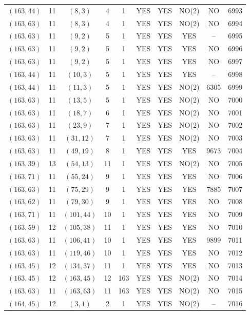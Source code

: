 \begin{longtable}{|c|c|c|c|c|c|c|c|c|c|}
$(163, 44)$ & 11 & $(8, 3)$ & 4 & 1 & YES & YES & NO(2) & NO & 6993\\
$(163, 63)$ & 11 & $(8, 3)$ & 4 & 1 & YES & YES & NO(2) & NO & 6994\\
$(163, 63)$ & 11 & $(9, 2)$ & 5 & 1 & YES & YES & YES & -- & 6995\\
$(163, 63)$ & 11 & $(9, 2)$ & 5 & 1 & YES & YES & YES & NO & 6996\\
$(163, 63)$ & 11 & $(9, 2)$ & 5 & 1 & YES & YES & YES & NO & 6997\\
$(163, 44)$ & 11 & $(10, 3)$ & 5 & 1 & YES & YES & YES & -- & 6998\\
$(163, 44)$ & 11 & $(11, 3)$ & 5 & 1 & YES & YES & NO(2) & 6305 & 6999\\
$(163, 63)$ & 11 & $(13, 5)$ & 5 & 1 & YES & YES & NO(2) & NO & 7000\\
$(163, 63)$ & 11 & $(18, 7)$ & 6 & 1 & YES & YES & NO(2) & NO & 7001\\
$(163, 63)$ & 11 & $(23, 9)$ & 7 & 1 & YES & YES & NO(2) & NO & 7002\\
$(163, 63)$ & 11 & $(31, 12)$ & 7 & 1 & YES & YES & NO(2) & NO & 7003\\
$(163, 63)$ & 11 & $(49, 19)$ & 8 & 1 & YES & YES & YES & 9673 & 7004\\
$(163, 39)$ & 13 & $(54, 13)$ & 11 & 1 & YES & YES & NO(2) & NO & 7005\\
$(163, 71)$ & 11 & $(55, 24)$ & 9 & 1 & YES & YES & YES & NO & 7006\\
$(163, 63)$ & 11 & $(75, 29)$ & 9 & 1 & YES & YES & YES & 7885 & 7007\\
$(163, 62)$ & 11 & $(79, 30)$ & 9 & 1 & YES & YES & YES & NO & 7008\\
$(163, 71)$ & 11 & $(101, 44)$ & 10 & 1 & YES & YES & YES & NO & 7009\\
$(163, 59)$ & 12 & $(105, 38)$ & 11 & 1 & YES & YES & YES & NO & 7010\\
$(163, 63)$ & 11 & $(106, 41)$ & 10 & 1 & YES & YES & YES & 9899 & 7011\\
$(163, 63)$ & 11 & $(119, 46)$ & 10 & 1 & YES & YES & YES & NO & 7012\\
$(163, 45)$ & 12 & $(134, 37)$ & 11 & 1 & YES & YES & YES & NO & 7013\\
$(163, 45)$ & 12 & $(163, 45)$ & 12 & 163 & YES & YES & NO(2) & NO & 7014\\
$(163, 63)$ & 11 & $(163, 63)$ & 11 & 163 & YES & YES & NO(2) & NO & 7015\\
$(164, 45)$ & 12 & $(3, 1)$ & 2 & 1 & YES & YES & NO(2) & -- & 7016\\

\end{longtable}
